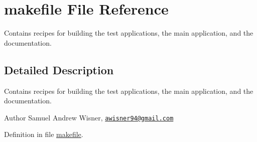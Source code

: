 \hypertarget{makefile}{\section{makefile File Reference}
\label{makefile}
}


Contains recipes for building the test applications, the main application, and the documentation.  




\subsection{Detailed Description}
Contains recipes for building the test applications, the main application, and the documentation. 

\begin{DoxyAuthor}{Author}
Samuel Andrew Wisner, \href{mailto:awisner94@gmail.com}{\tt awisner94@gmail.\+com} 
\end{DoxyAuthor}


Definition in file \hyperlink{makefile_source}{makefile}.

